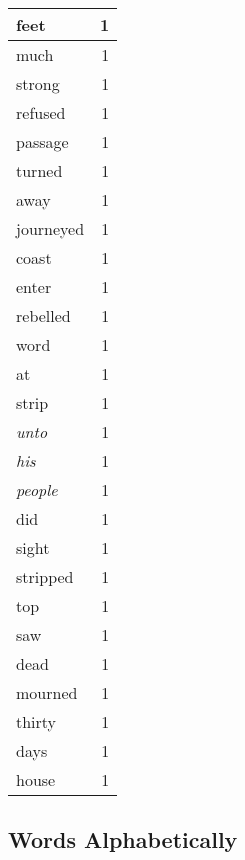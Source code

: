 \begin{center}
\begin{longtable}{l|r}
feet & 1 \\ \hline
much & 1 \\ \hline
strong & 1 \\ \hline
refused & 1 \\ \hline
passage & 1 \\ \hline
turned & 1 \\ \hline
away & 1 \\ \hline
journeyed & 1 \\ \hline
coast & 1 \\ \hline
enter & 1 \\ \hline
rebelled & 1 \\ \hline
word & 1 \\ \hline
at & 1 \\ \hline
strip & 1 \\ \hline
\emph{unto} & 1 \\ \hline
\emph{his} & 1 \\ \hline
\emph{people} & 1 \\ \hline
did & 1 \\ \hline
sight & 1 \\ \hline
stripped & 1 \\ \hline
top & 1 \\ \hline
saw & 1 \\ \hline
dead & 1 \\ \hline
mourned & 1 \\ \hline
thirty & 1 \\ \hline
days & 1 \\ \hline
house & 1 \\ \hline
\end{longtable}
\end{center}



\normalsize



\subsection{Words Alphabetically}

